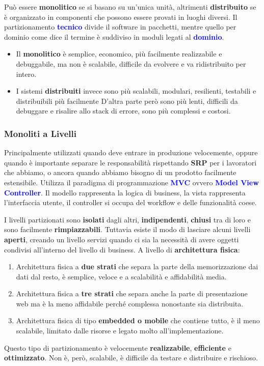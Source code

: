 Può essere \textbf{\textcolor{forest_green}{monolitico}} se si basano su un'unica unità, altrimenti \textbf{\textcolor{forest_green}{distribuito}} se è organizzato in componenti che possono essere provati in luoghi diversi.
Il partizionamento \textbf{\textcolor{blue}{tecnico}} divide il software in pacchetti, mentre quello per dominio come dice il termine è suddiviso in moduli legati al \textbf{\textcolor{blue}{dominio}}.

\begin{itemize}
    \item Il \textbf{monolitico} è semplice, economico, più facilmente realizzabile e debuggabile, ma non è scalabile, difficile da evolvere e va ridistribuito per intero.
    \item I sistemi \textbf{distribuiti} invece sono più scalabili, modulari, resilienti, testabili e distribuibili più facilmente
    D'altra parte però sono più lenti, difficili da debuggare e risalire allo stack di errore, sono più complessi e costosi.
\end{itemize}

\subsubsection{Monoliti a Livelli}
Principalmente utilizzati quando deve entrare in produzione velocemente, oppure quando è importante separare le responsabilità rispettando \textbf{SRP} per i lavoratori che abbiamo, o ancora quando abbiamo bisogno di un prodotto facilmente estensibile.
Utilizza il paradigma di programmazione \textbf{\textcolor{blue}{MVC}} ovvero \textbf{\textcolor{blue}{Model View Controller}}. Il modello rappresenta la logica di business, la vista rappresenta l'interfaccia utente, il controller si occupa del workflow e delle funzionalità coese.

\vspace*{0.02\textheight}
I livelli partizionati sono \textbf{isolati} dagli altri, \textbf{indipendenti}, \textbf{chiusi} tra di loro e sono facilmente \textbf{rimpiazzabili}. Tuttavia esiste il modo di lasciare alcuni livelli \textbf{aperti}, creando un livello servizi quando ci sia la necessità di avere oggetti condivisi all'interno del livello di business. A livello di \textbf{architettura fisica}:
\begin{enumerate}
    \item Architettura fisica a \textbf{due strati} che separa la parte della memorizzazione dai dati dal resto, è semplice, veloce e a scalabilità e affidabilità media.
    \item  Architettura fisica a \textbf{tre strati} che separa anche la parte di presentazione web ma è la meno affidabile perché complessa nonostante sia distribuita.
    \item Architettura fisica di tipo \textbf{embedded o mobile} che contiene tutto, è il meno scalabile, limitato dalle risorse e legato molto all'implementazione.
\end{enumerate}
Questo tipo di partizionamento è velocemente \textbf{realizzabile}, \textbf{efficiente} e \textbf{ottimizzato}. Non è, però, scalabile, è difficile da testare e distribuire e rischioso.

